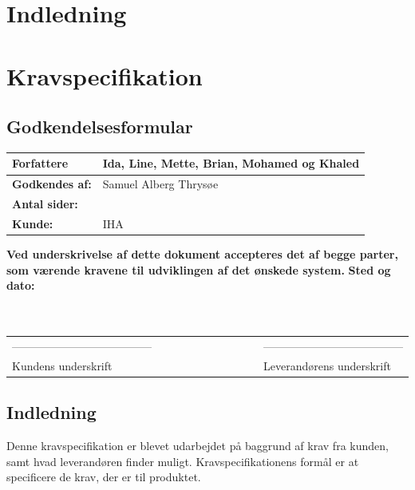 \chapter{Indledning}

\chapter{Kravspecifikation}
\section{Godkendelsesformular}
\begin{table}[h!]
\label{tab:tabel2}
\begin{tabular}{| l | >{\raggedright\arraybackslash}p{12cm} |}
   \hline
   \textbf{Forfattere} & Ida, Line, Mette, Brian, Mohamed og Khaled\\ \hline
   \textbf{Godkendes af:} & Samuel Alberg Thrysøe\\ \hline
   \textbf{Antal sider:} & \\ \hline
   \textbf{Kunde:} & IHA\\ \hline
\end{tabular}
\end{table}
\textbf{Ved underskrivelse af dette dokument accepteres det af begge parter, som værende kravene til udviklingen af det ønskede system.}
\newline
\textbf{Sted og dato:}\\
\\
\\
\begin{table}
[h!]
\begin{tabular}{ l lllllllll l}
--------------------------------------&&&&&&&&&&--------------------------------------\\ 
Kundens underskrift &&&&&&&&&&Leverandørens underskrift\\
\end{tabular}
\end{table}
\section{Indledning}
Denne kravspecifikation er blevet udarbejdet på baggrund af krav fra kunden, samt hvad leverandøren finder muligt. Kravspecifikationens formål er at specificere de krav, der er til produktet. 
\newpage
